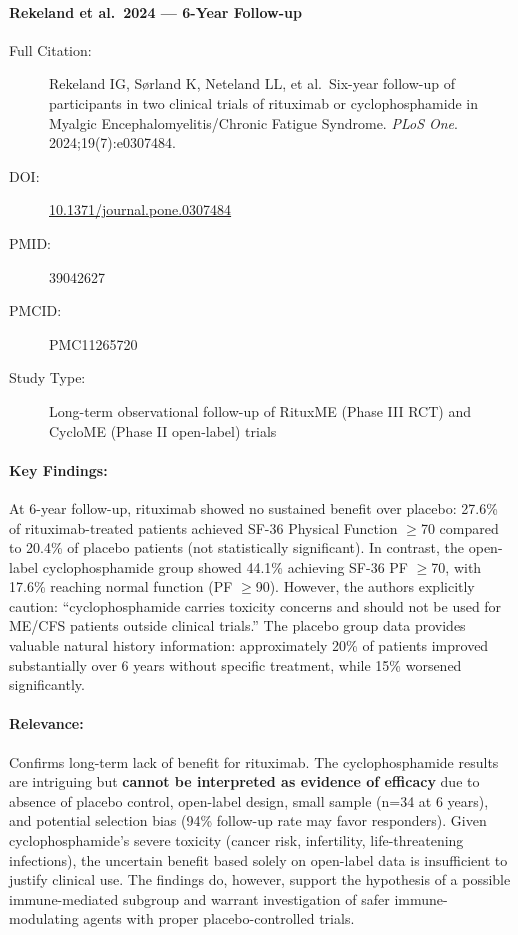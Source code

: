 \paragraph{Rekeland et al.\ 2024 --- 6-Year Follow-up}

\begin{description}
    \item[Full Citation:] Rekeland IG, Sørland K, Neteland LL, et al.\ Six-year follow-up of participants in two clinical trials of rituximab or cyclophosphamide in Myalgic Encephalomyelitis/Chronic Fatigue Syndrome. \textit{PLoS One}. 2024;19(7):e0307484.
    \item[DOI:] \href{https://doi.org/10.1371/journal.pone.0307484}{10.1371/journal.pone.0307484}
    \item[PMID:] 39042627
    \item[PMCID:] PMC11265720
    \item[Study Type:] Long-term observational follow-up of RituxME (Phase III RCT) and CycloME (Phase II open-label) trials
\end{description}

\paragraph{Key Findings:}
At 6-year follow-up, rituximab showed no sustained benefit over placebo: 27.6\% of rituximab-treated patients achieved SF-36 Physical Function $\geq$70 compared to 20.4\% of placebo patients (not statistically significant). In contrast, the open-label cyclophosphamide group showed 44.1\% achieving SF-36 PF $\geq$70, with 17.6\% reaching normal function (PF $\geq$90). However, the authors explicitly caution: ``cyclophosphamide carries toxicity concerns and should not be used for ME/CFS patients outside clinical trials.'' The placebo group data provides valuable natural history information: approximately 20\% of patients improved substantially over 6 years without specific treatment, while 15\% worsened significantly.

\paragraph{Relevance:}
Confirms long-term lack of benefit for rituximab. The cyclophosphamide results are intriguing but \textbf{cannot be interpreted as evidence of efficacy} due to absence of placebo control, open-label design, small sample (n=34 at 6 years), and potential selection bias (94\% follow-up rate may favor responders). Given cyclophosphamide's severe toxicity (cancer risk, infertility, life-threatening infections), the uncertain benefit based solely on open-label data is insufficient to justify clinical use. The findings do, however, support the hypothesis of a possible immune-mediated subgroup and warrant investigation of safer immune-modulating agents with proper placebo-controlled trials.

